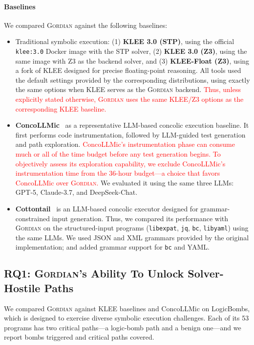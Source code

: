 \documentclass[acmsmall]{acmart}
\newcommand{\rev}[1]{\textcolor{red}{#1}}
\newcommand{\rev}[1]{#1}
\newcommand{\projName}{\textsc{Gordian}\xspace}
\theoremstyle{definition}
\begin{document}
\paragraph*{Baselines} We compared \projName against the following baselines:
\begin{itemize}
\item Traditional symbolic execution: (1) \textbf{KLEE 3.0 (STP)}, using the official \texttt{klee:3.0} Docker image with the STP solver, (2) \textbf{KLEE 3.0 (Z3)}, using the same image with Z3 as the backend solver, and (3) \textbf{KLEE-Float (Z3)}, using a fork of KLEE \cite{kleeFloat} designed for precise floating-point reasoning. All tools used the default settings provided by the corresponding distributions, using exactly the same options when KLEE serves as the \projName backend. \rev{Thus, unless explicitly stated otherwise, \projName{} uses the same KLEE/Z3 options as the corresponding KLEE baseline.}
\item \textbf{ConcoLLMic}~\cite{concollmic} as a representative LLM-based concolic execution baseline. It first performs code instrumentation, followed by LLM-guided test generation and path exploration. \rev{ConcoLLMic's instrumentation phase can consume much or all of the time budget before any test generation begins. To objectively assess its exploration capability, we exclude ConcoLLMic's instrumentation time from the 36-hour budget---a choice that favors ConcoLLMic over \projName{}.} We evaluated it using the same three LLMs: GPT-5, Claude-3.7, and DeepSeek-Chat.
\item \textbf{Cottontail}~\cite{cottontail} is an LLM-based concolic executor designed for grammar-constrained input generation. Thus, we compared its performance with \projName on the structured-input programs (\texttt{libexpat}, \texttt{jq}, \texttt{bc}, \texttt{libyaml}) using the same LLMs. We used JSON and XML grammars provided by the original implementation; and added grammar support for \texttt{bc} and YAML.
\end{itemize}

\subsection{RQ1: \projName's Ability To Unlock Solver-Hostile Paths}

We compared \projName{} against KLEE baselines and ConcoLLMic on LogicBombs, which is designed to exercise diverse symbolic execution challenges. Each of its 53 programs has two critical paths---a logic-bomb path and a benign one---and we report bombs triggered and critical paths covered.
\end{document}
